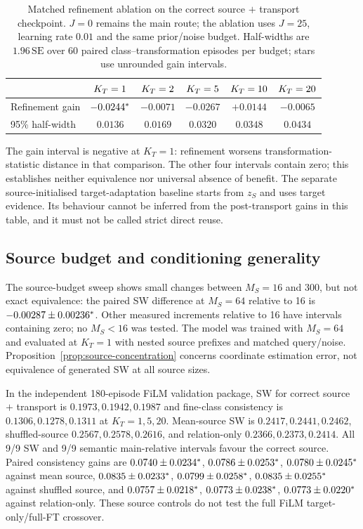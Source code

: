 \begin{table}[h]
\centering\small
\caption{Matched refinement ablation on the correct source $+$ transport checkpoint. $J=0$ remains the main route; the ablation uses $J=25$, learning rate $0.01$ and the same prior/noise budget. Half-widths are $1.96\,\mathrm{SE}$ over 60 paired class--transformation episodes per budget; stars use unrounded gain intervals.}
\label{tab:cifar-refinement}
\begin{tabular}{lccccc}
\toprule
 & $K_T=1$ & $K_T=2$ & $K_T=5$ & $K_T=10$ & $K_T=20$\\
\midrule
Refinement gain & $-0.0244^{\ast}$ & $-0.0071$ & $-0.0267$ & $+0.0144$ & $-0.0065$\\
95\% half-width & $0.0136$ & $0.0169$ & $0.0320$ & $0.0348$ & $0.0434$\\
\bottomrule
\end{tabular}
\end{table}

The gain interval is negative at $K_T=1$: refinement worsens transformation-statistic distance in that comparison. The other four intervals contain zero; this establishes neither equivalence nor universal absence of benefit. The separate source-initialised target-adaptation baseline starts from $z_S$ and uses target evidence. Its behaviour cannot be inferred from the post-transport gains in this table, and it must not be called strict direct reuse.

\subsection{Source budget and conditioning generality}
The source-budget sweep shows small changes between $M_S=16$ and 300, but not exact equivalence: the paired SW difference at $M_S=64$ relative to 16 is $-0.00287\pm0.00236^{\ast}$. Other measured increments relative to 16 have intervals containing zero; no $M_S<16$ was tested. The model was trained with $M_S=64$ and evaluated at $K_T=1$ with nested source prefixes and matched query/noise. Proposition~\ref{prop:source-concentration} concerns coordinate estimation error, not equivalence of generated SW at all source sizes.

In the independent 180-episode FiLM validation package, SW for correct source $+$ transport is $0.1973, 0.1942, 0.1987$ and fine-class consistency is $0.1306, 0.1278, 0.1311$ at $K_T=1,5,20$. Mean-source SW is $0.2417, 0.2441, 0.2462$, shuffled-source $0.2567, 0.2578, 0.2616$, and relation-only $0.2366, 0.2373, 0.2414$. All 9/9 SW and 9/9 semantic main-relative intervals favour the correct source. Paired consistency gains are $0.0740\pm0.0234^{\ast}$, $0.0786\pm0.0253^{\ast}$, $0.0780\pm0.0245^{\ast}$ against mean source, $0.0835\pm0.0233^{\ast}$, $0.0799\pm0.0258^{\ast}$, $0.0835\pm0.0255^{\ast}$ against shuffled source, and $0.0757\pm0.0218^{\ast}$, $0.0773\pm0.0238^{\ast}$, $0.0773\pm0.0220^{\ast}$ against relation-only. These source controls do not test the full FiLM target-only/full-FT crossover.

